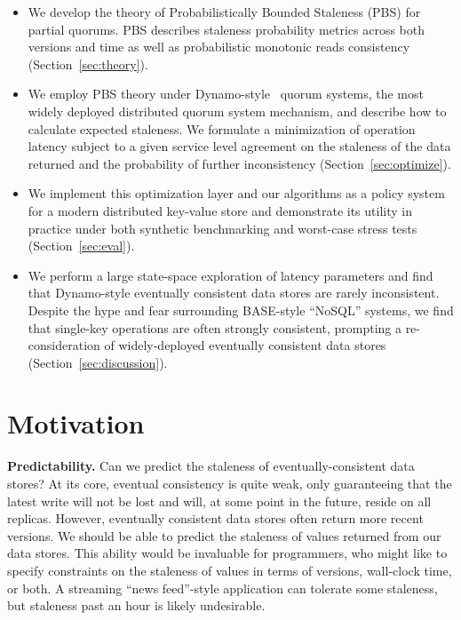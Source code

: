\documentclass{vldb}
\begin{document}
\begin{itemize}

\item We develop the theory of Probabilistically Bounded
  Staleness (PBS) for partial quorums. PBS describes staleness
  probability metrics across both versions and time as well as
  probabilistic monotonic reads consistency
  (Section~\ref{sec:theory}).

\item We employ PBS theory under Dynamo-style~\cite{dynamo} quorum
  systems, the most widely deployed distributed quorum system
  mechanism, and describe how to calculate expected staleness.  We
  formulate a minimization of operation latency subject to a given
  service level agreement on the staleness of the data returned and
  the probability of further inconsistency
  (Section~\ref{sec:optimize}).

\item We implement this optimization layer and our algorithms as a
  policy system for a modern distributed key-value store and
  demonstrate its utility in practice under both synthetic
  benchmarking and worst-case stress tests (Section~\ref{sec:eval}).

\item We perform a large state-space exploration of latency parameters
  and find that Dynamo-style eventually consistent data stores are
  rarely inconsistent.  Despite the hype and fear surrounding
  BASE-style ``NoSQL'' systems, we find that single-key operations are
  often strongly consistent, prompting a re-consideration of
  widely-deployed eventually consistent data stores
  (Section~\ref{sec:discussion}).

\end{itemize}

\section{Motivation}

\textbf{Predictability.} Can we predict the staleness of 
eventually-consistent data stores? At its core, eventual consistency
is quite weak, only guaranteeing that the latest write will not be
lost and will, at some point in the future, reside on all replicas.
However, eventually consistent data stores often return more recent
versions.  We should be able to predict the staleness of values
returned from our data stores.  This ability would be invaluable for
programmers, who might like to specify constraints on the staleness of
values in terms of versions, wall-clock time, or both.  A streaming
``news feed''-style application can tolerate some staleness, but
staleness past an hour is likely undesirable.
\end{document}
